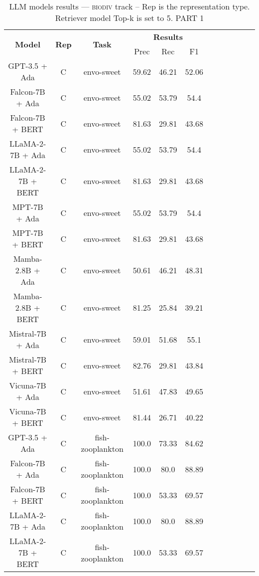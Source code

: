 \begin{table}
        \centering
        \small
        \caption{LLM models results --- \textsc{biodiv} track -- Rep is the representation type. Retriever model Top-k is set to 5. PART 1 } \label{tab:llm_biodiv1}
        \begin{tabular}{|c|c|c|c|c|c|c|c|c|c|c|c|}
            \hline
             \multirow{2}{*}{\textbf{Model}}  & \multirow{2}{*}{\textbf{Rep}}  & \multirow{2}{*}{\textbf{Task}} &  \multicolumn{3}{c|}{\textbf{Results}} \\
             \cline{4-6}
              & & & Prec & Rec & F1  \\
            \hline
	GPT-3.5 + Ada  & C & envo-sweet  &  59.62 &  46.21 & 52.06  \\
	Falcon-7B + Ada  & C & envo-sweet  &  55.02 &  53.79 & 54.4  \\
	Falcon-7B + BERT  & C & envo-sweet  &  81.63 &  29.81 & 43.68  \\
	LLaMA-2-7B + Ada  & C & envo-sweet  &  55.02 &  53.79 & 54.4  \\
	LLaMA-2-7B + BERT  & C & envo-sweet  &  81.63 &  29.81 & 43.68  \\
	MPT-7B + Ada  & C & envo-sweet  &  55.02 &  53.79 & 54.4  \\
	MPT-7B + BERT  & C & envo-sweet  &  81.63 &  29.81 & 43.68  \\
	Mamba-2.8B + Ada  & C & envo-sweet  &  50.61 &  46.21 & 48.31  \\
	Mamba-2.8B + BERT  & C & envo-sweet  &  81.25 &  25.84 & 39.21  \\
	Mistral-7B + Ada  & C & envo-sweet  &  59.01 &  51.68 & 55.1  \\
	Mistral-7B + BERT  & C & envo-sweet  &  82.76 &  29.81 & 43.84  \\
	Vicuna-7B + Ada  & C & envo-sweet  &  51.61 &  47.83 & 49.65  \\
	Vicuna-7B + BERT  & C & envo-sweet  &  81.44 &  26.71 & 40.22  \\
	\hline
	GPT-3.5 + Ada  & C & fish-zooplankton  &  100.0 &  73.33 & 84.62  \\
	Falcon-7B + Ada  & C & fish-zooplankton  &  100.0 &  80.0 & 88.89  \\
	Falcon-7B + BERT  & C & fish-zooplankton  &  100.0 &  53.33 & 69.57  \\
	LLaMA-2-7B + Ada  & C & fish-zooplankton  &  100.0 &  80.0 & 88.89  \\
	LLaMA-2-7B + BERT  & C & fish-zooplankton  &  100.0 &  53.33 & 69.57  \\

\end{tabular}
\end{table}
